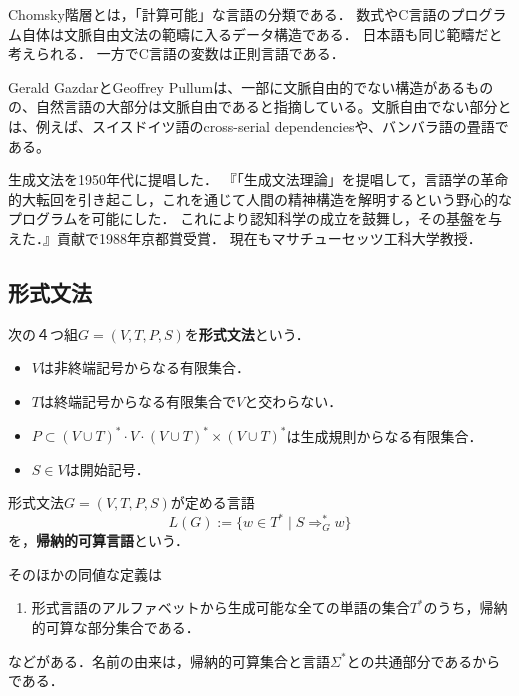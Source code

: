 \documentclass[uplatex, dvipdfmx]{jsreport}
\begin{document}
\begin{tcolorbox}[colframe=ForestGreen, colback=ForestGreen!10!white, breakable]
    Chomsky階層とは，「計算可能」な言語の分類である．
    数式やC言語のプログラム自体は文脈自由文法の範疇に入るデータ構造である．
    日本語も同じ範疇だと考えられる．
    一方でC言語の変数は正則言語である．
\end{tcolorbox}
\begin{remark}
    Gerald GazdarとGeoffrey Pullumは、一部に文脈自由的でない構造があるものの、自然言語の大部分は文脈自由であると指摘している\cite{Pullum, Geoffrey}。文脈自由でない部分とは、例えば、スイスドイツ語のcross-serial dependencies\cite{Shieber, Stuart}や、バンバラ語の畳語である\cite{Culy, Christopher}。
\end{remark}

\begin{history}
    生成文法を1950年代に提唱した．
    『「生成文法理論」を提唱して，言語学の革命的大転回を引き起こし，これを通じて人間の精神構造を解明するという野心的なプログラムを可能にした．
    これにより認知科学の成立を鼓舞し，その基盤を与えた．』貢献で1988年京都賞受賞．
    現在もマサチューセッツ工科大学教授．
\end{history}

\subsection{形式文法}

\begin{definition}
    次の４つ組$G=(V,T,P,S)$を\textbf{形式文法}という．
    \begin{itemize}
        \item $V$は非終端記号からなる有限集合．
        \item $T$は終端記号からなる有限集合で$V$と交わらない．
        \item $P\subset (V\cup T)^*\cdot V\cdot (V\cup T)^*\times (V\cup T)^*$は生成規則からなる有限集合．
        \item $S\in V$は開始記号．
    \end{itemize}
\end{definition}

\begin{definition}
    形式文法$G=(V,T,P,S)$が定める言語
    \[L(G):=\{w\in T^*\mid S\Rightarrow_G^*w\}\]
    を，\textbf{帰納的可算言語}という．
\end{definition}
\begin{remark}
    そのほかの同値な定義は
    \begin{enumerate}
        \item 形式言語のアルファベットから生成可能な全ての単語の集合$T^*$のうち，帰納的可算な部分集合である．
    \end{enumerate}
    などがある．名前の由来は，帰納的可算集合と言語$\Sigma^*$との共通部分であるからである．
\end{remark}
\end{document}
